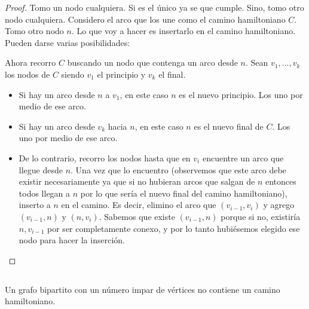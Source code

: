 \begin{proof}
    Tomo un nodo cualquiera. Si es el único ya se que cumple. Sino, tomo otro nodo cualquiera. Considero el arco que los une como el camino hamiltoniano $C$. Tomo otro nodo $n$. Lo que voy a hacer es insertarlo en el camino hamiltoniano. Pueden darse varias posibilidades:

    Ahora recorro $C$ buscando un nodo que contenga un arco desde $n$. Sean $v_1, ..., v_k$ los nodos de $C$ siendo $v_1$ el principio y $v_k$ el final.

    \begin{itemize}
        \item Si hay un arco desde $n$ a $v_1$, en este caso $n$ es el nuevo principio. Los uno por medio de ese arco.
        \item Si hay un arco desde $v_k$ hacia $n$, en este caso $n$ es el nuevo final de $C$. Los uno por medio de ese arco.
        \item De lo contrario, recorro los nodos hasta que en $v_i$ encuentre un arco que llegue desde $n$. Una vez que lo encuentro (observemos que este arco debe existir necesariamente ya que si no hubieran arcos que salgan de $n$ entonces todos llegan a $n$ por lo que sería el nuevo final del camino hamiltoniano), inserto a $n$ en el camino. Es decir, elimino el arco que $(v_{i-1}, v_i)$ y agrego $(v_{i-1}, n)$ y $(n, v_i)$. Sabemos que existe $(v_{i-1}, n)$ porque si no, existiría $n, v_{i-1}$ por ser completamente conexo, y por lo tanto hubiésemos elegido ese nodo para hacer la inserción.
    \end{itemize}
\end{proof}

\subsection{}

\begin{lema}
    Un grafo bipartito con un número impar de vértices no contiene un camino hamiltoniano.
\end{lema}

